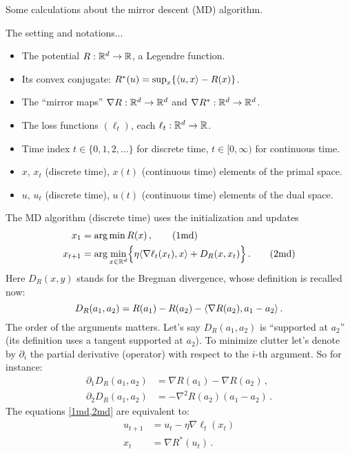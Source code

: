 \documentclass[12pt]{report}
\theoremstyle{plain}
\theoremstyle{definition}
\theoremstyle{remark}
\begin{document}

Some calculations about the mirror descent (MD) algorithm.

\bigskip

\noindent
The setting and notations...
\begin{itemize}[leftmargin=*, itemsep=2pt]
\item The potential $R : \mathbb{R}^d \to \mathbb{R}$, a Legendre function.
\item Its convex conjugate: $R^{*}(u) = \sup_{x} \{ \langle {u,x}\rangle - R(x)\}$.
\item The ``mirror maps'' $\nabla R : \mathbb{R}^d \to \mathbb{R}^d$ and $\nabla R^{*} : \mathbb{R}^d \to \mathbb{R}^d$.
\item The loss functions $(\ell_t)$, each $\ell_t : \mathbb{R}^d \to \mathbb{R}$.
\item Time index $t \in \{ 0,1,2,\ldots \}$ for discrete time, $t \in [0,\infty)$ for continuous time.
\item $x$, $x_t$ (discrete time), $x(t)$ (continuous time) elements of the primal space.
\item $u$, $u_t$ (discrete time), $u(t)$ (continuous time) elements of the dual space.
\end{itemize}
The MD algorithm (discrete time) uses the initialization and updates
\begin{align}
x_1 &= \arg\min R(x)\,, \tag{1md} \\
x_{t+1} &= \arg\min_{x \in \mathbb{R}^d} \Bigl\{ \eta \langle {\nabla\ell_t(x_{t}), x}\rangle + D_{R}(x, x_{t})\Bigr\}\,.
\tag{2md}
\end{align}
Here $D_{R}(x,y)$ stands for the Bregman divergence, whose definition is recalled now:
\[
D_{R}(a_{1}, a_{2}) = R(a_{1}) - R(a_{2}) - \langle {\nabla R(a_2), a_{1} - a_{2}}\rangle\,.
\]
The order of the arguments matters.
Let's say $D_{R}(a_{1},a_{2})$ is ``supported at $a_{2}$''
(its definition uses a tangent supported at $a_{2}$).
To minimize clutter let's denote by $\partial_{i}$ the partial derivative (operator)
with respect to the $i$-th argument. So for instance:
\begin{align*}
\partial_{1} D_{R}(a_{1}, a_{2}) &= \nabla R(a_{1}) - \nabla R(a_{2})\,, \\[1mm]
\partial_{2} D_{R}(a_{1}, a_{2}) &= - \nabla^2 R(a_{2})(a_{1} - a_{2})\,.
\end{align*}
The equations \eqref{1md,2md} are equivalent to:
\begin{align*}
u_{t+1} &= u_{t} - \eta \nabla \ell_{t}(x_{t}) \label{eq.dtime.1} \tag{1dt} \\
x_{t} &= \nabla R^{*}(u_{t})\,. \label{eq.dtime.2} \tag{2dt}
\end{align*}
\end{document}
